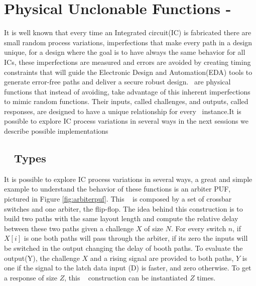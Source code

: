 




\section{Physical Unclonable Functions - \pufs~}
\label{sec:pufs}
It is well known that every time an Integrated circuit(IC) is fabricated there are small random process variations, imperfections that make every path in a design unique, for a design where the goal is to have always the same behavior for all ICs, these imperfections are measured and errors are avoided by creating timing constraints that will guide the Electronic Design and Automation(EDA) tools to  generate error-free paths and deliver a \rm{secure} robust design. \pufs~are physical functions that instead of avoiding, take advantage of this inherent imperfections to mimic random functions. Their inputs, called challenges, and outputs, called responses, are designed to have a unique relationship for every \puf~instance.It is possible to explore IC process variations in several ways\cite{DBLP:phdbasesearchMaes12} in the next sessions we describe  possible implementations%

\subsection{\puf~ Types}
It is possible to explore IC process variations in several ways, a great and simple example to understand the behavior of these functions is an arbiter PUF, pictured in Figure \ref{fig:arbiterpuf}.
This \puf~ is composed by a set of crossbar switches and one arbiter, the flip-flop. The idea behind this construction is to build two paths with the same layout length and compute the relative delay between these two paths given a challenge $X$ of size $N$.  For every switch $n$, if $X[i]$  is one both paths will pass through the arbiter, if its zero the inputs will be switched in the output changing the delay of booth paths. To evaluate the output(Y), the challenge $X$ and a rising signal are provided to both paths, $Y$ is one if the signal to the latch data input (D) is faster, and zero otherwise. To get a response of size $Z$, this \puf~ construction  can be instantiated $Z$ times.


